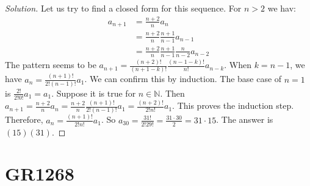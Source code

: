 \documentclass[crop=false,class=book]{standalone}
\begin{document}
        \begin{proof}[Solution]
        Let us try to find a closed form for this sequence. For $n>2$ we hav:
        \begin{align*}
            a_{n+1} &= \frac{n+2}{n}a_n \\
            &= \frac{n+2}{n}\frac{n+1}{n-1}a_{n-1}\\
            &= \frac{n+2}{n}\frac{n+1}{n-1}\frac{n}{n-2}a_{n-2}
        \end{align*}
        The pattern seems to be $a_{n+1} = \frac{(n+2)!}{(n+1-k)!}\frac{(n-1-k)!}{n!}a_{n-k}$. When $k=n-1$, we have $a_{n} = \frac{(n+1)!}{2!(n-1)!}a_1$. We can confirm this by induction. The base case of $n=1$ is $\frac{2!}{2!0!}a_1 = a_1$. Suppose it is true for $n\in \mathbb{N}$. Then $a_{n+1} = \frac{n+2}{n} a_n = \frac{n+2}{n} \frac{(n+1)!}{2!(n-1)!}a_1 = \frac{(n+2)!}{2!n!}a_1$. This proves the induction step. Therefore, $a_n = \frac{(n+1)!}{2!n!}a_1$. So $a_{30} = \frac{31!}{2!29!} = \frac{31\cdot 30}{2} = 31\cdot 15$. The answer is $(15)(31)$.
        \end{proof}
\section{GR1268}
\end{document}
